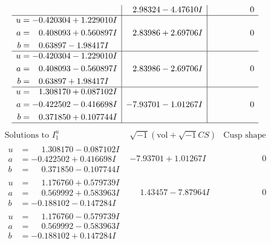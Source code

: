 \documentclass[1p]{elsarticle_modified}
\theoremstyle{definition}
\newcommand{\I}{\sqrt{-1}}
\begin{document}
$$\begin{array}{c|c|c}
 & \phantom{-}2.98324 - 4.47610 I & \phantom{-0.000000 } 0 \\ \hline\begin{aligned}
u &= -0.420304 + 1.229010 I \\
a &= \phantom{-}0.408093 + 0.560897 I \\
b &= \phantom{-}0.63897 - 1.98417 I\end{aligned}
 & \phantom{-}2.83986 + 2.69706 I & \phantom{-0.000000 } 0 \\ \hline\begin{aligned}
u &= -0.420304 - 1.229010 I \\
a &= \phantom{-}0.408093 - 0.560897 I \\
b &= \phantom{-}0.63897 + 1.98417 I\end{aligned}
 & \phantom{-}2.83986 - 2.69706 I & \phantom{-0.000000 } 0 \\ \hline\begin{aligned}
u &= \phantom{-}1.308170 + 0.087102 I \\
a &= -0.422502 - 0.416698 I \\
b &= \phantom{-}0.371850 + 0.107744 I\end{aligned}
 & -7.93701 - 1.01267 I & \phantom{-0.000000 } 0\\
 \hline 
 \end{array}$$\newpage$$\begin{array}{c|c|c}  
\text{Solutions to }I^u_{1}& \I (\text{vol} + \sqrt{-1}CS) & \text{Cusp shape}\\
 \hline 
\begin{aligned}
u &= \phantom{-}1.308170 - 0.087102 I \\
a &= -0.422502 + 0.416698 I \\
b &= \phantom{-}0.371850 - 0.107744 I\end{aligned}
 & -7.93701 + 1.01267 I & \phantom{-0.000000 } 0 \\ \hline\begin{aligned}
u &= \phantom{-}1.176760 + 0.579739 I \\
a &= \phantom{-}0.569992 + 0.583963 I \\
b &= -0.188102 - 0.147284 I\end{aligned}
 & \phantom{-}1.43457 - 7.87964 I & \phantom{-0.000000 } 0 \\ \hline\begin{aligned}
u &= \phantom{-}1.176760 - 0.579739 I \\
a &= \phantom{-}0.569992 - 0.583963 I \\
b &= -0.188102 + 0.147284 I\end{aligned}

\end{array}$$
\end{document}
